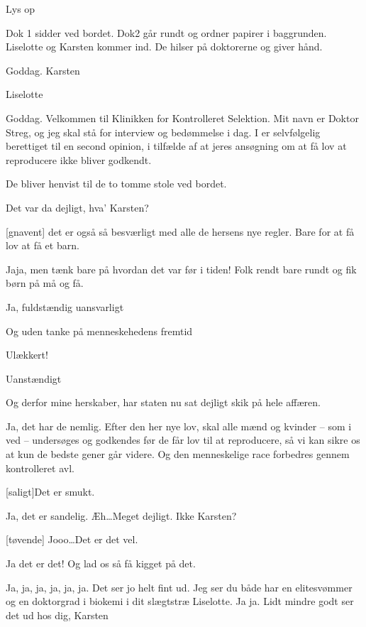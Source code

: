 \documentclass[a4paper,11pt]{article}
\begin{document}
\begin{sketch}


\scene Lys op

\scene Dok 1 sidder ved bordet. Dok2 går rundt og ordner papirer i baggrunden. Liselotte og Karsten kommer ind. De hilser på doktorerne og giver hånd.

 Goddag. Karsten

 Liselotte

 Goddag. Velkommen til Klinikken for Kontrolleret Selektion. Mit navn er Doktor Streg, og jeg skal stå for interview og bedømmelse i dag. I er selvfølgelig berettiget til en second opinion, i tilfælde af at jeres ansøgning om at få lov at reproducere ikke bliver godkendt.
 
\scene De bliver henvist til de to tomme stole ved bordet.  

 Det var da dejligt, hva' Karsten?

[gnavent] det er også så besværligt med alle de hersens nye regler. Bare for at få lov at få et barn.

 Jaja, men tænk bare på hvordan det var før i tiden! Folk rendt bare rundt og fik børn på må og få.

 Ja, fuldstændig uansvarligt

 Og uden tanke på menneskehedens fremtid

 Ulækkert!

 Uanstændigt

 Og derfor mine herskaber, har staten nu sat dejligt skik på hele affæren.

 Ja, det har de nemlig. Efter den her nye lov, skal alle mænd og kvinder – som i ved – undersøges og godkendes før de får lov til at reproducere, så vi kan sikre os at kun de bedste gener går videre. Og den menneskelige race forbedres gennem kontrolleret avl.

[saligt]Det er smukt.

 Ja, det er sandelig. Æh\ldots Meget dejligt. Ikke Karsten?

[tøvende] Jooo\ldots Det er det vel.

 Ja det er det! Og lad os så få kigget på det.

 
 Ja, ja, ja, ja, ja, ja. Det ser jo helt fint ud. Jeg ser du både har en elitesvømmer og en doktorgrad i biokemi i dit slægtstræ Liselotte. Ja ja. Lidt mindre godt ser det ud hos dig, Karsten


\end{sketch}
\end{document}
